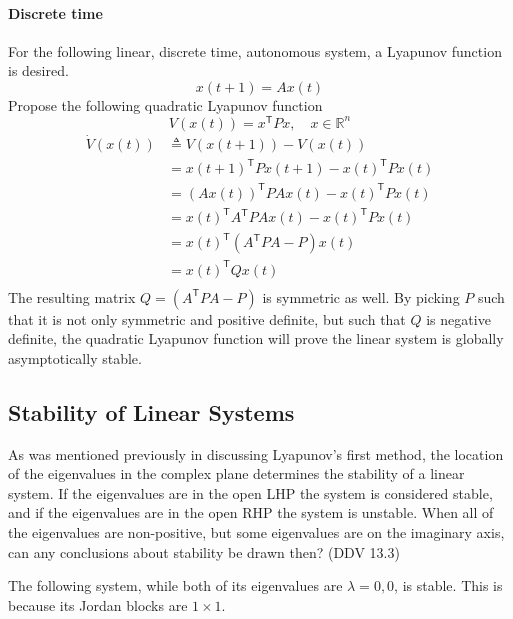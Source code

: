 \paragraph{Discrete time}
For the following linear, discrete time, autonomous system, a Lyapunov function is desired.
\begin{equation*}
  x(t+1)=Ax(t)
\end{equation*}
Propose the following quadratic Lyapunov function
\begin{equation*}
  V(x(t))=x^{\mathsf{T}}Px, \quad x\in \mathbb{R}^{n}
\end{equation*}
\begin{equation*}
  \begin{split}
    \dot{V}(x(t))&\triangleq V(x(t+1))-V(x(t)) \\
    &=x(t+1)^{\mathsf{T}}Px(t+1)-x(t)^{\mathsf{T}}Px(t) \\
    &=(Ax(t))^{\mathsf{T}}PAx(t)-x(t)^{\mathsf{T}}Px(t) \\
    &=x(t)^{\mathsf{T}}A^{\mathsf{T}}PAx(t)-x(t)^{\mathsf{T}}Px(t) \\
    &=x(t)^{\mathsf{T}}(A^{\mathsf{T}}PA-P)x(t) \\
    &=x(t)^{\mathsf{T}}Qx(t) \\
  \end{split}
\end{equation*}
The resulting matrix $Q=(A^{\mathsf{T}}PA-P)$ is symmetric as well.
By picking $P$ such that it is not only symmetric and positive definite, but such that $Q$ is negative definite, the quadratic Lyapunov function will prove the linear system is globally asymptotically stable.

\subsection{Stability of Linear Systems}

As was mentioned previously in discussing Lyapunov's first method, the location of the eigenvalues in the complex plane determines the stability of a linear system.
If the eigenvalues are in the open LHP the system is considered stable, and if the eigenvalues are in the open RHP the system is unstable.
When all of the eigenvalues are non-positive, but some eigenvalues are on the imaginary axis, can any conclusions about stability be drawn then? (DDV 13.3)

The following system, while both of its eigenvalues are $\lambda=0,0$, is stable.
This is because its Jordan blocks are $1\times1$.

